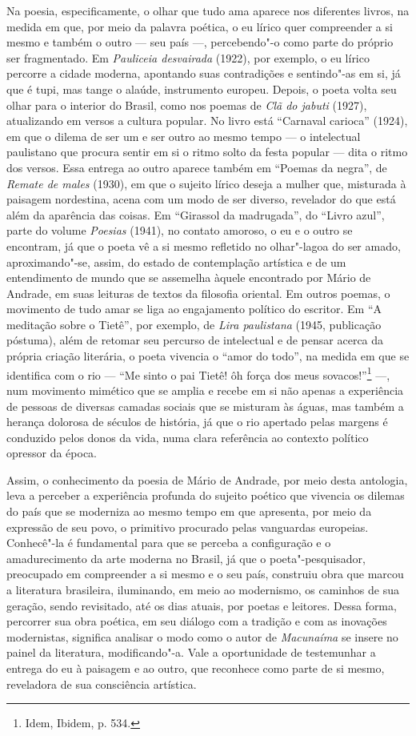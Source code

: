 Na poesia, especificamente, o olhar que tudo ama aparece nos diferentes
livros, na medida em que, por meio da palavra poética, o eu lírico quer
compreender a si mesmo e também o outro --- seu país ---, percebendo"-o
como parte do próprio ser fragmentado. Em \emph{Pauliceia desvairada}
(1922), por exemplo, o eu lírico percorre a cidade moderna, apontando
suas contradições e sentindo"-as em si, já que é tupi, mas tange o
alaúde, instrumento europeu. Depois, o poeta volta seu olhar para o
interior do Brasil, como nos poemas de \emph{Clã do jabuti} (1927),
atualizando em versos a cultura popular. No livro está ``Carnaval
carioca'' (1924), em que o dilema de ser um e ser outro ao mesmo tempo
--- o intelectual paulistano que procura sentir em si o ritmo solto da
festa popular --- dita o ritmo dos versos. Essa entrega ao outro aparece
também em ``Poemas da negra'', de \emph{Remate de males} (1930),
em que o sujeito lírico deseja a mulher que, misturada à paisagem
nordestina, acena com um modo de ser diverso, revelador do que está além da
aparência das coisas. Em ``Girassol da madrugada'', do ``Livro azul'',
parte do volume \emph{Poesias} (1941), no contato amoroso, o eu e o
outro se encontram, já que o poeta vê a si mesmo refletido no
olhar"-lagoa do ser amado, aproximando"-se, assim, do estado de
contemplação artística e de um entendimento de mundo que se assemelha
àquele encontrado por Mário de Andrade, em suas leituras de textos da
filosofia oriental. Em outros poemas, o movimento de tudo amar se liga
ao engajamento político do escritor. Em ``A meditação sobre o
Tietê'', por exemplo, de \emph{Lira paulistana} (1945, publicação
póstuma), além de retomar seu percurso de intelectual e de pensar acerca
da própria criação literária, o poeta vivencia o ``amor do todo'', na
medida em que se identifica com o rio --- ``Me sinto o pai Tietê! ôh
força dos meus sovacos!''\footnote{Idem, Ibidem, p. 534.} ---, num
movimento mimético que se amplia e recebe em si não apenas a experiência
de pessoas de diversas camadas sociais que se misturam às águas, mas
também a herança dolorosa de séculos de história, já que o rio
apertado pelas margens é conduzido pelos donos da vida, numa clara
referência ao contexto político opressor da época.

Assim, o conhecimento da poesia de Mário de Andrade, por meio desta
antologia, leva a perceber a experiência profunda do sujeito poético que
vivencia os dilemas do país que se moderniza ao mesmo tempo em que
apresenta, por meio da expressão de seu povo, o primitivo procurado
pelas vanguardas europeias. Conhecê"-la é fundamental para que se perceba
a configuração e o amadurecimento da arte moderna no Brasil, já que o
poeta"-pesquisador, preocupado em compreender a si mesmo e o seu país,
construiu obra que marcou a literatura brasileira, iluminando, em meio
ao modernismo, os caminhos de sua geração, sendo revisitado, até os dias
atuais, por poetas e leitores. Dessa forma,
percorrer sua obra poética, em seu diálogo com a tradição e com as
inovações modernistas, significa analisar o modo como o autor de
\emph{Macunaíma} se insere no painel da literatura, modificando"-a. Vale
a oportunidade de testemunhar a entrega do eu à paisagem e ao outro, que
reconhece como parte de si mesmo, reveladora de sua consciência
artística.

